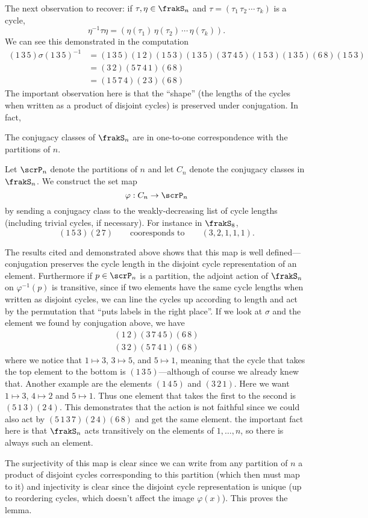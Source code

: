 \documentclass[12pt]{article}
\begin{document}
The next observation to recover: if $\tau,\eta\in\frakS_n$ and $\tau=(\tau_1\,\tau_2\,\cdots\,\tau_k)$ is a cycle, 
\[\eta^{-1}\tau\eta=(\eta(\tau_1)\,\eta(\tau_2)\,\cdots\,\eta(\tau_k)).\]
We can see this demonstrated in the computation
\begin{align*}
	(1\,3\,5)\sigma(1\,3\,5)^{-1}&=(1\,3\,5)(1\,2)(1\,5\,3)(1\,3\,5)(3\,7\,4\,5)(1\,5\,3)(1\,3\,5)(6\,8)(1\,5\,3)\\
	&=(3\,2)(5\,7\,4\,1)(6\,8)\\
	&=(1\,5\,7\,4)(2\,3)(6\,8)
\end{align*}
The important observation here is that the ``shape'' (the lengths of the cycles when written as a product of disjoint cycles) is preserved under conjugation.
In fact,
\begin{lem}\label{lem:conj-classes}
	The conjugacy classes of $\frakS_n$ are in one-to-one correspondence with the partitions of $n$.
\end{lem}
\begin{prf}
	Let $\scrP_n$ denote the partitions of $n$ and let $C_n$ denote the conjugacy classes in $\frakS_n$.
	We construct the set map 
	\[\varphi:C_n\to \scrP_n\]
	by sending a conjugacy class to the weakly-decreasing list of cycle lengths (including trivial cycles, if necessary). For instance in $\frakS_8$,
	\[(1\,5\,3)(2\,7)\qquad\text{cooresponds to}\qquad (3,2,1,1,1).\]

	The results cited and demonstrated above shows that this map is well defined---conjugation preserves the cycle length in 
	the disjoint cycle representation of an element. Furthermore if $p\in \scrP_n$ is a partition, the adjoint action of $\frakS_n$ on $\varphi^{-1}(p)$
	is transitive, since if two elements have the same cycle lengths when written as disjoint cycles, we can line 
	the cycles up according to length and act by the permutation that ``puts labels in the right place''. If we look at $\sigma$ and the 
	element we found by conjugation above, we have 
	\begin{align*}
		(1\,2)(3\,7\,4\,5)(6\,8)\\
		(3\,2)(5\,7\,4\,1)(6\,8)
	\end{align*}
	where we notice that $1\mapsto 3$, $3\mapsto 5$, and $5\mapsto 1$, meaning that the cycle that takes the top element to the 
	bottom is $(1\,3\,5)$---although of course we already knew that. Another example are the elements $(1\,4\,5)$ and $(3\,2\,1)$. Here we want $1\mapsto 3$, $4\mapsto 2$ and $5\mapsto 1$.
	Thus one element that takes the first to the second is $(5\,1\,3)(2\,4)$. This demonstrates that the action is not faithful since we could also act by $(5\,1\,3\,7)(2\,4)(6\,8)$ and get the same element. 
	the important fact here is that $\frakS_n$ acts transitively on the elements of $1,\dots,n$, so there is always such an element.

	The surjectivity of this map is clear since we can write from any partition of $n$ a product of disjoint cycles corresponding to 
	this partition (which then must map to it) and injectivity is clear since the disjoint cycle representation is unique (up to reordering cycles, which doesn't affect the image $\varphi(x)$).
	This proves the lemma.
\end{prf}
\end{document}
